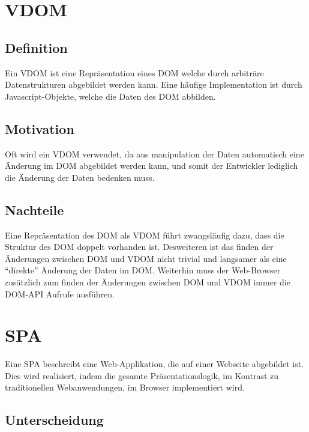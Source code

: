 \section{\acl{VDOM}}
\subsection{Definition}

Ein \ac{VDOM} ist eine Repräsentation eines \ac{DOM} welche durch arbiträre
Datenstrukturen abgebildet werden kann. Eine häufige Implementation ist durch
Javascript-Objekte, welche die Daten des \ac{DOM} abbilden.

\subsection{Motivation}

Oft wird ein \ac{VDOM} verwendet, da aus manipulation der Daten automatisch eine
Änderung im \ac{DOM} abgebildet werden kann, und somit der Entwickler lediglich
die Änderung der Daten bedenken muss.

\subsection{Nachteile}

Eine Repräsentation des \ac{DOM} als \ac{VDOM} führt zwangsläufig dazu, dass die
Struktur des \ac{DOM} doppelt vorhanden ist. Desweiteren ist das finden der
Änderungen zwischen \ac{DOM} und \ac{VDOM} nicht trivial und langsamer als eine
``direkte'' Änderung der Daten im \ac{DOM}. Weiterhin muss der Web-Browser
zusätzlich zum finden der Änderungen zwischen \ac{DOM} und \ac{VDOM} immer
die \ac{DOM}-\ac{API} Aufrufe ausführen.

\section{\acl{SPA}}
Eine \ac{SPA} beschreibt eine Web-Applikation, die auf einer Webseite abgebildet ist. Dies wird realisiert, indem die gesamte Präsentationslogik, im Kontrast zu traditionellen Webanwendungen, im Browser implementiert wird.\cite{SPA} 
\subsection{Unterscheidung}
